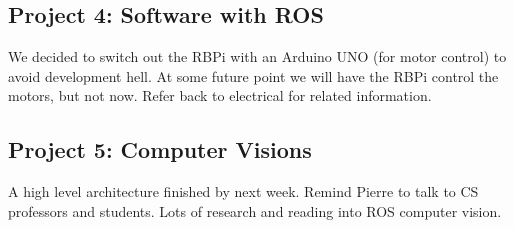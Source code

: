 \documentclass[a4paper, 10pt]{article}
\begin{document}
	\subsection*{Project 4: Software with ROS}
	We decided to switch out the RBPi with an Arduino UNO (for motor control) to avoid development hell. At some future point we will have the RBPi control the motors, but not now. Refer back to electrical for related information.
	
	\subsection*{Project 5: Computer Visions}
	A high level architecture finished by next week. Remind Pierre to talk to CS professors and students. Lots of research and reading into ROS computer vision. 
	
\end{document}
